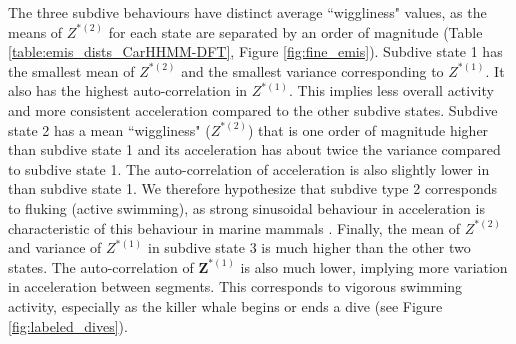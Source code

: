 The three subdive behaviours have distinct average ``wiggliness" values, as the means of $Z^{*(2)}$ for each state are separated by an order of magnitude (Table \ref{table:emis_dists_CarHHMM-DFT}, Figure \ref{fig:fine_emis}). 
Subdive state 1 has the smallest mean of $Z^{*(2)}$ and the smallest variance corresponding to $Z^{*(1)}$. It also has the highest auto-correlation in $Z^{*(1)}$. This implies less overall activity and more consistent acceleration compared to the other subdive states. 
Subdive state 2 has a mean ``wiggliness" ($Z^{*(2)}$) that is one order of magnitude higher than subdive state 1 and its acceleration has about twice the variance compared to subdive state 1. The auto-correlation of acceleration is also slightly lower in than subdive state 1. We therefore hypothesize that subdive type 2 corresponds to fluking (active swimming), as strong sinusoidal behaviour in acceleration is characteristic of this behaviour in marine mammals \citep{Simon:2012}.
Finally, the mean of $Z^{*(2)}$ and variance of $Z^{*(1)}$ in subdive state 3 is much higher than the other two states. The auto-correlation of $\mathbf{Z}^{*(1)}$ is also much lower, implying more variation in acceleration between segments. This corresponds to vigorous swimming activity, especially as the killer whale begins or ends a dive (see Figure \ref{fig:labeled_dives}). 

